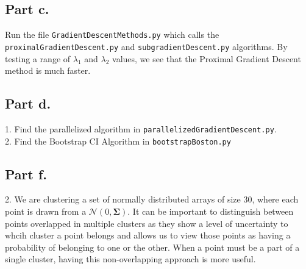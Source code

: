 \documentclass[12pt]{article}
\begin{document}
\subsection*{Part c.}
Run the file \texttt{GradientDescentMethods.py} which calls the \texttt{proximalGradientDescent.py} and \texttt{subgradientDescent.py} algorithms. By testing a range of $\lambda_1$ and $\lambda_2$ values, we see that the Proximal Gradient Descent method is much faster. 
\subsection*{Part d.}
1. Find the parallelized algorithm in \texttt{parallelizedGradientDescent.py}. \\
2. Find the Bootstrap CI Algorithm in \texttt{bootstrapBoston.py} \\
\subsection*{Part f.}
2. We are clustering a set of normally distributed arrays of size 30, where each point is drawn from a $\mathcal{N}(0,\mathbf{\Sigma})$. It can be important to distinguish between points overlapped in multiple clusters as they show a level of uncertainty to whcih cluster a point belongs and allows us to view those points as having a probability of belonging to one or the other. When a point must be a part of a single cluster, having this non-overlapping approach is more useful.
\end{document}
